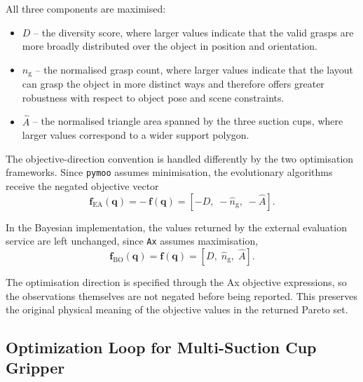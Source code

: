 All three components are maximised:

\begin{itemize}
    \item $D$ -- the diversity score, where larger values indicate that the valid grasps are more
          broadly distributed over the object in position and orientation.
    \item $\hat{n}_{\mathrm{g}}$ -- the normalised grasp count, where larger values indicate that
          the layout can grasp the object in more distinct ways and therefore offers greater
          robustness with respect to object pose and scene constraints.
    \item $\hat{A}$ -- the normalised triangle area spanned by the three suction cups, where larger
          values correspond to a wider support polygon.
\end{itemize}

The objective-direction convention is handled differently by the two optimisation frameworks. Since
\texttt{pymoo} assumes minimisation, the evolutionary algorithms receive the negated objective
vector
\begin{equation}
    \mathbf{f}_{\mathrm{EA}}(\mathbf{q})
    =
    -\,\mathbf{f}(\mathbf{q})
    =
    \left[-D,\;-\hat{n}_{\mathrm{g}},\;-\hat{A}\right].
\end{equation}

In the Bayesian implementation, the values returned by the external evaluation service are left
unchanged, since \texttt{Ax} assumes maximisation,
\begin{equation}
    \mathbf{f}_{\mathrm{BO}}(\mathbf{q})
    =
    \mathbf{f}(\mathbf{q})
    =
    \left[D,\;\hat{n}_{\mathrm{g}},\;\hat{A}\right].
\end{equation}

The optimisation direction is specified through the Ax objective expressions, so the observations
themselves are not negated before being reported. This preserves the original physical meaning of
the objective values in the returned Pareto set.

\subsection{Optimization Loop for Multi-Suction Cup Gripper}

